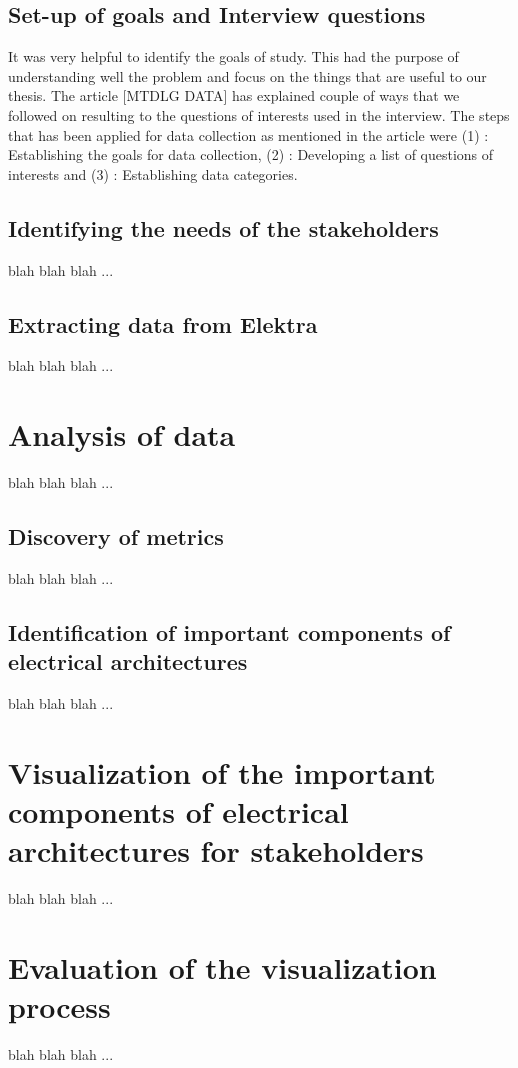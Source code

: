 \subsection{Set-up of goals and Interview questions}
It was very helpful to identify the goals of study. This had the purpose of understanding well the problem and focus on the things that are useful to our thesis. The article [MTDLG DATA] has explained couple of ways that we followed on resulting to the questions of interests used in the interview. The steps that has been applied for data collection as mentioned in the article were (1) :  Establishing the goals for data collection, (2) : Developing a list of questions of interests and (3) : Establishing data categories. 

\subsection{Identifying the needs of the stakeholders}
blah blah blah ... \todo{[to be filled in]}

\subsection{Extracting data from Elektra}
blah blah blah ... \todo{[to be filled in]}

%
\section{Analysis of data}
blah blah blah ... \todo{[to be filled in]}

\subsection{Discovery of metrics}
blah blah blah ... \todo{[to be filled in]}

\subsection{Identification of important components of electrical architectures}
blah blah blah ... \todo{[to be filled in]}

%
\section{Visualization of the important components of electrical architectures for stakeholders}
blah blah blah ... \todo{[to be filled in]}

\section{Evaluation of the visualization process}
blah blah blah ... \todo{[to be filled in]}